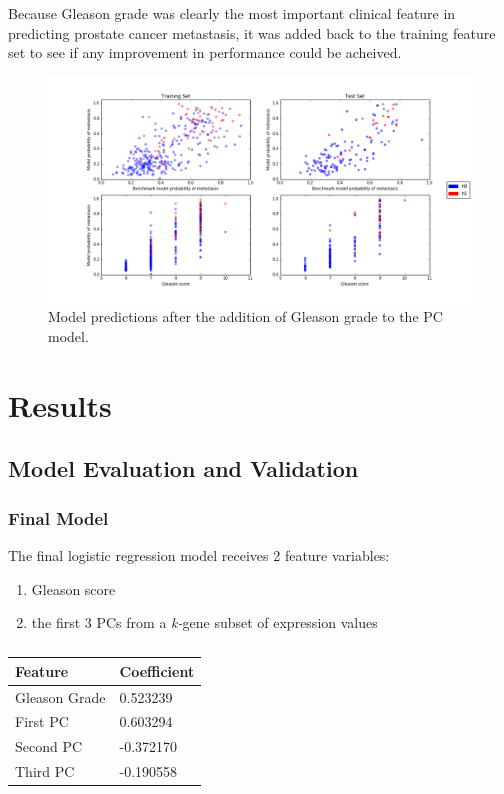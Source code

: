 \documentclass[final]{article}
\begin{document}
Because Gleason grade was clearly the most important clinical feature in predicting
prostate cancer metastasis, it was added back to the training feature set to see
if any improvement in performance could be acheived.

\begin{figure}[h!]
  \centering
  \includegraphics[width=\textwidth]{PC3Gleason}
  \caption{\label{fig:PC3GG}Model predictions after the addition of Gleason grade to the PC model.}
\end{figure}


\section{Results}

\subsection{Model Evaluation and Validation}

\subsubsection{Final Model}

The final logistic regression model receives 2 feature variables:

\begin{enumerate}
\item Gleason score
\item the first 3 PCs from a \textit{k-}gene subset of expression values
\end{enumerate}

\begin{table}
  \centering
  \caption{\label{tab:FFcoefs}}
    \begin{tabular}{l l}
      \hline
      Feature & Coefficient \\ \hline
      Gleason Grade & 0.523239  \\
      First PC & 0.603294 \\
      Second PC & -0.372170  \\
      Third PC &  -0.190558 \\
      \hline
    \end{tabular}
\end{table}
\end{document}
